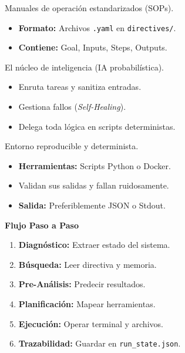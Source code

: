 \documentclass[a3paper,landscape,12pt]{article}
\begin{document}
\begin{tcbraster}[raster columns=3, raster equal height=rows, raster column skip=1cm]
\begin{tcolorbox}[base=\faLayerGroup\ La Arquitectura de 3 Capas]
\begin{tcolorbox}[innerbox={layer1}{\faFileCode\ Layer 1: Directives (Qué hacer)}]
Manuales de operación estandarizados (SOPs).
\begin{itemize}
    \item \textbf{Formato:} Archivos \texttt{.yaml} en \texttt{directives/}.
    \item \textbf{Contiene:} Goal, Inputs, Steps, Outputs.
\end{itemize}
\end{tcolorbox}
\vspace{0.2cm}
\begin{tcolorbox}[innerbox={layer2}{\faNetworkWired\ Layer 2: Orchestration (Tú)}]
El núcleo de inteligencia (IA probabilística).
\begin{itemize}
    \item Enruta tareas y sanitiza entradas.
    \item Gestiona fallos (\textit{Self-Healing}).
    \item Delega toda lógica en scripts deterministas.
\end{itemize}
\end{tcolorbox}
\vspace{0.2cm}
\begin{tcolorbox}[innerbox={layer3}{\faCogs\ Layer 3: Execution (Cómo hacerlo)}]
Entorno reproducible y determinista.
\begin{itemize}
    \item \textbf{Herramientas:} Scripts Python o Docker.
    \item Validan sus salidas y fallan ruidosamente.
    \item \textbf{Salida:} Preferiblemente JSON o Stdout.
\end{itemize}
\end{tcolorbox}
\end{tcolorbox}%
\begin{tcolorbox}[base=\faProjectDiagram\ Algoritmo de Ejecución]
\textbf{Flujo Paso a Paso}
\begin{enumerate}
    \item \textbf{Diagnóstico:} Extraer estado del sistema.
    \item \textbf{Búsqueda:} Leer directiva y memoria.
    \item \textbf{Pre-Análisis:} Predecir resultados.
    \item \textbf{Planificación:} Mapear herramientas.
    \item \textbf{Ejecución:} Operar terminal y archivos.
    \item \textbf{Trazabilidad:} Guardar en \texttt{run\_state.json}.

\end{enumerate}
\end{tcolorbox}
\end{tcbraster}
\end{document}
